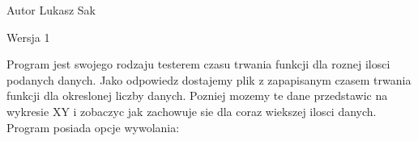 \begin{DoxyAuthor}{Autor}
Lukasz Sak 
\end{DoxyAuthor}
\begin{DoxyVersion}{Wersja}
1
\end{DoxyVersion}
Program jest swojego rodzaju testerem czasu trwania funkcji dla roznej ilosci podanych danych. Jako odpowiedz dostajemy plik z zapapisanym czasem trwania funkcji dla okreslonej liczby danych. Pozniej mozemy te dane przedstawic na wykresie XY i zobaczyc jak zachowuje sie dla coraz wiekszej ilosci danych. Program posiada opcje wywolania: 